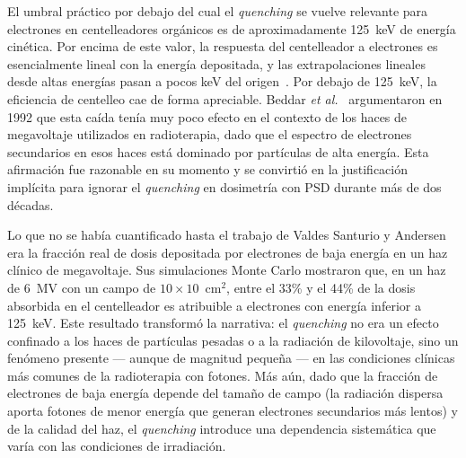 \documentclass[11pt,a4paper]{article}
\begin{document}
El umbral práctico por debajo del cual el \textit{quenching} se vuelve relevante para electrones en centelleadores orgánicos es de aproximadamente 125~keV de energía cinética. Por encima de este valor, la respuesta del centelleador a electrones es esencialmente lineal con la energía depositada, y las extrapolaciones lineales desde altas energías pasan a pocos keV del origen~\cite{beddar1992}. Por debajo de 125~keV, la eficiencia de centelleo cae de forma apreciable. Beddar \textit{et al.}~\cite{beddar1992} argumentaron en 1992 que esta caída tenía muy poco efecto en el contexto de los haces de megavoltaje utilizados en radioterapia, dado que el espectro de electrones secundarios en esos haces está dominado por partículas de alta energía. Esta afirmación fue razonable en su momento y se convirtió en la justificación implícita para ignorar el \textit{quenching} en dosimetría con PSD durante más de dos décadas.

Lo que no se había cuantificado hasta el trabajo de Valdes Santurio y Andersen~\cite{santurio2019} era la fracción real de dosis depositada por electrones de baja energía en un haz clínico de megavoltaje. Sus simulaciones Monte Carlo mostraron que, en un haz de 6~MV con un campo de $10 \times 10$~cm$^{2}$, entre el 33\% y el 44\% de la dosis absorbida en el centelleador es atribuible a electrones con energía inferior a 125~keV. Este resultado transformó la narrativa: el \textit{quenching} no era un efecto confinado a los haces de partículas pesadas o a la radiación de kilovoltaje, sino un fenómeno presente --- aunque de magnitud pequeña --- en las condiciones clínicas más comunes de la radioterapia con fotones. Más aún, dado que la fracción de electrones de baja energía depende del tamaño de campo (la radiación dispersa aporta fotones de menor energía que generan electrones secundarios más lentos) y de la calidad del haz, el \textit{quenching} introduce una dependencia sistemática que varía con las condiciones de irradiación.

\end{document}
